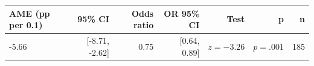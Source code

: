 \begin{tabular}{lrrrrrr}
\toprule
AME (pp per 0.1) & 95\% CI & Odds ratio & OR 95\% CI & Test & p & n \\
\midrule
-5.66 & [-8.71, -2.62] & 0.75 & [0.64, 0.89] & $z=-3.26$ & $p=.001$ & 185 \\
\bottomrule
\end{tabular}
